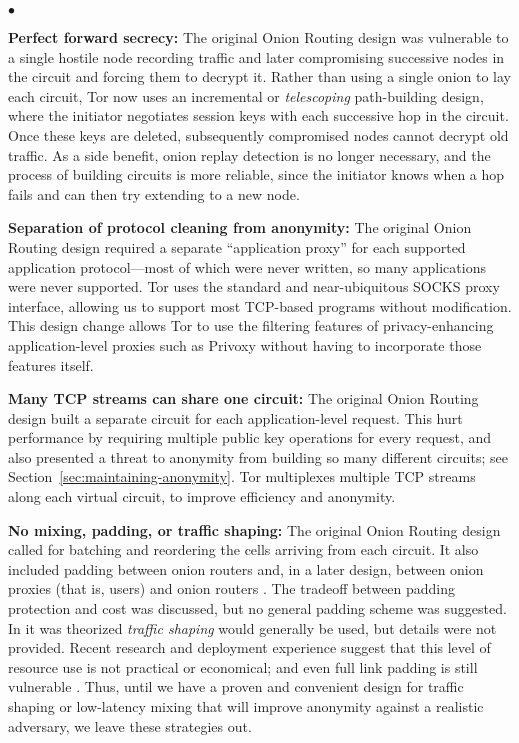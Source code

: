 \documentclass[times,10pt,twocolumn]{article}
\newenvironment{tightlist}{\begin{list}{$\bullet$}{
  \setlength{\itemsep}{0mm}
    \setlength{\parsep}{0mm}
    }}{\end{list}}
\begin{document}
\begin{tightlist}

\item \textbf{Perfect forward secrecy:} The original Onion Routing
design was vulnerable to a single hostile node recording traffic and later
compromising successive nodes in the circuit and forcing them to
decrypt it. 
Rather than using a single onion to lay each circuit,
Tor now uses an incremental or \emph{telescoping}
path-building design, where the initiator negotiates session keys with
each successive hop in the circuit.  Once these keys are deleted,
subsequently compromised nodes cannot decrypt old traffic.
As a side benefit, onion replay detection is no longer
necessary, and the process of building circuits is more reliable, since
the initiator knows when a hop fails and can then try extending to a new node.


\item \textbf{Separation of protocol cleaning from anonymity:}
The original Onion Routing design required a separate ``application
proxy'' for each
supported application protocol---most
of which were never written, so many applications were never supported.
Tor uses the standard and near-ubiquitous SOCKS
\cite{socks4} proxy interface, allowing us to support most TCP-based
programs without modification.  This design change allows Tor to
use the filtering features of privacy-enhancing
application-level proxies such as Privoxy \cite{privoxy} without having to
incorporate those features itself.

\item \textbf{Many TCP streams can share one circuit:} The original
Onion Routing design built a separate circuit for each application-level
request.
This hurt performance by requiring multiple public key operations for
every request, and also presented
a threat to anonymity from building so many different circuits; see
Section~\ref{sec:maintaining-anonymity}.
Tor multiplexes multiple TCP streams along each virtual
circuit, to improve efficiency and anonymity.

\item \textbf{No mixing, padding, or traffic shaping:} The original
Onion Routing design called for batching and reordering the cells arriving
from each circuit. It also included padding between onion routers and,
in a later design, between onion
proxies (that is, users) and onion routers \cite{or-ih96,or-jsac98}.
The tradeoff between padding protection and cost was discussed, but no
general padding scheme was suggested. In
\cite{or-pet00} it was theorized \emph{traffic shaping} would generally
be used, but details were not provided.
Recent research \cite{econymics} and deployment
experience \cite{freedom21-security} suggest that this level of resource
use is not practical or economical; and even full link padding is still
vulnerable \cite{defensive-dropping}. Thus, until we have a proven and
convenient design for traffic shaping or low-latency mixing that
will improve anonymity against a realistic adversary, we leave these
strategies out.


\end{tightlist}
\end{document}
